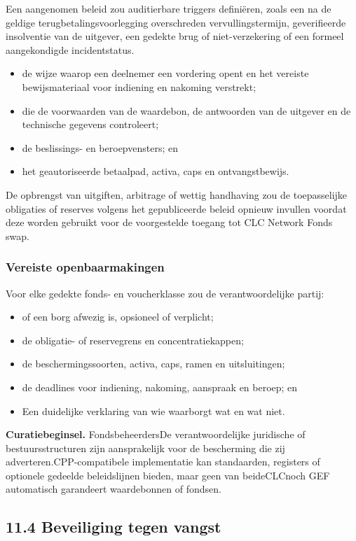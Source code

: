 \documentclass[11pt]{article}
\begin{document}
Een aangenomen beleid zou auditierbare triggers definiëren, zoals een na de geldige terugbetalingsvoorlegging overschreden vervullingstermijn, geverifieerde insolventie van de uitgever, een gedekte brug of niet-verzekering of een formeel aangekondigde incidentstatus.

\begin{itemize}[leftmargin=*]
\item de wijze waarop een deelnemer een vordering opent en het vereiste bewijsmateriaal voor indiening en nakoming verstrekt;
\item die de voorwaarden van de waardebon, de antwoorden van de uitgever en de technische gegevens controleert;
\item de beslissings- en beroepvensters; en
\item het geautoriseerde betaalpad, activa, caps en ontvangstbewijs.
\end{itemize}
De opbrengst van uitgiften, arbitrage of wettig handhaving zou de toepasselijke obligaties of reserves volgens het gepubliceerde beleid opnieuw invullen voordat deze worden gebruikt voor de voorgestelde toegang tot CLC Network Fonds swap.

\subsubsection*{Vereiste openbaarmakingen}

Voor elke gedekte fonds- en voucherklasse zou de verantwoordelijke partij:

\begin{itemize}[leftmargin=*]
\item of een borg afwezig is, opsioneel of verplicht;
\item de obligatie- of reservegrens en concentratiekappen;
\item de beschermingssoorten, activa, caps, ramen en uitsluitingen;
\item de deadlines voor indiening, nakoming, aanspraak en beroep; en
\item Een duidelijke verklaring van wie waarborgt wat en wat niet.
\end{itemize}
\textbf{Curatiebeginsel.} FondsbeheerdersDe verantwoordelijke juridische of bestuursstructuren zijn aansprakelijk voor de bescherming die zij adverteren.CPP-compatibele implementatie kan standaarden, registers of optionele gedeelde beleidslijnen bieden, maar geen van beideCLCnoch GEF automatisch garandeert waardebonnen of fondsen.

\subsection*{11.4 Beveiliging tegen vangst}
\end{document}
